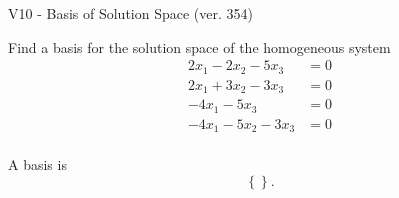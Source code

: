 \begin{exercise}
  \begin{exerciseTitle}V10 - Basis of Solution Space (ver. 354)\end{exerciseTitle}
  \begin{exerciseStatement}
    Find a basis for the solution space of the homogeneous system 
\begin{align*}
 2 x_ 1 -2 x_ 2 -5 x_ 3 &= 0  \\ 
  2 x_ 1 + 3 x_ 2 -3 x_ 3 &= 0  \\ 
  -4 x_ 1 -5 x_ 3 &= 0  \\ 
  -4 x_ 1 -5 x_ 2 -3 x_ 3 &= 0  \\ 
 \end{align*}


 
  \end{exerciseStatement}

  \begin{exerciseAnswer}
   A basis is   
\[\left\{\right\}.\]

  


  \end{exerciseAnswer}
\end{exercise}